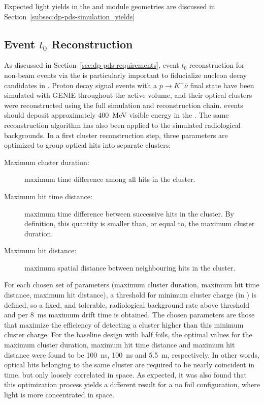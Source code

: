 Expected  light yields in the  and   module geometries are discussed in Section~\ref{subsec:dp-pds-simulation_yields}


\subsection{Event $t_{0}$ Reconstruction}
\label{subsec:dp-pds-performance_t0}

As discussed in Section~\ref{sec:dp-pds-requirements}, event $t_0$ reconstruction for non-beam events via the  is particularly important to fiducialize nucleon decay candidates in . Proton decay signal events with a %
$p\rightarrow K^{+} \bar\nu$ final state have been simulated with GENIE \cite{Andreopoulos:2009rq} throughout the   active volume, and their optical clusters were reconstructed using the full simulation and reconstruction chain.  events should deposit approximately \SI{400}{\MeV} visible energy in the \lar. The same reconstruction algorithm has also been applied to the simulated radiological backgrounds. In a first cluster reconstruction step, three parameters are optimized to group optical hits into separate clusters:
%
\begin{description}
\item[Maximum cluster duration:] maximum time difference among all  hits in the cluster.
\item[Maximum hit time distance:] maximum time difference between successive  hits in the cluster. By definition, this quantity is smaller than, or equal to, the maximum cluster duration.
\item[Maximum hit distance:] maximum spatial distance between neighbouring  hits in the cluster. 
\end{description}

For each chosen set of parameters (maximum cluster duration, maximum hit time distance, maximum hit distance), a threshold for minimum cluster charge (in ) is defined, so a fixed, and tolerable, radiological background rate above threshold and per \SI{8}{\milli\s} maximum drift time is obtained. The chosen parameters are those that maximize the efficiency of detecting a  cluster higher than this minimum cluster charge. For the  baseline design with half foils, the optimal values for the maximum cluster duration, maximum hit time distance and maximum hit distance were found to be \SI{100}{\ns}, \SI{100}{\ns} and \SI{5.5}{\m}, respectively. In other words, optical hits belonging to the same cluster are required to be nearly coincident in time, but only loosely correlated in space. As expected, it was also found that this optimization process yields a different result for a no foil  configuration, where light is more concentrated in space. 

